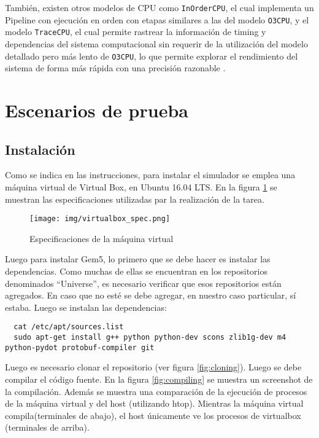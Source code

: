 \documentclass {article}
\begin{document}
También, existen otros modelos de CPU como \texttt{InOrderCPU}, el cual implementa un Pipeline con
ejecución en orden con etapas similares a las del modelo \texttt{O3CPU}, y el modelo
\texttt{TraceCPU}, el cual permite rastrear la información de timing y dependencias del sistema
computacional sin requerir de la utilización del modelo detallado pero más lento de \texttt{O3CPU},
lo que permite explorar el rendimiento del sistema de forma más rápida con una precisión razonable
\cite{binkert2017}.


\section{Escenarios de prueba}

\subsection{Instalación}
Como se indica en las instrucciones, para instalar el simulador se emplea una máquina virtual de
Virtual Box, en Ubuntu 16.04 LTS. En la figura \ref{fig:specs_vbox}
se muestran las especificaciones utilizadas par la realización de la tarea.

\begin{figure}[H]
  \centering
  \texttt{[image: img/virtualbox\_spec.png]}
  \caption{\label{fig:specs_vbox} Especificaciones de la máquina virtual}
\end{figure}
 
Luego para instalar Gem5, lo primero que se debe hacer es instalar las dependencias. Como muchas de
ellas se encuentran en los repositorios denominados “Universe”, es necesario verificar que esos
repositorios están agregados. En caso que no esté se debe agregar, en nuestro caso particular, sí estaba. Luego se instalan las dependencias:

\begin{lstlisting}
  cat /etc/apt/sources.list
  sudo apt-get install g++ python python-dev scons zlib1g-dev m4  python-pydot protobuf-compiler git
\end{lstlisting}
 
Luego es necesario clonar el repositorio (ver figura \ref{fig:cloning}). Luego se debe compilar el
código fuente. En la figura \ref{fig:compiling} se muestra un screenshot de la compilación. Además
se muestra una comparación de la ejecución de procesos de la máquina virtual y del host (utilizando
htop). Mientras la máquina virtual compila(terminales de abajo), el host únicamente ve los procesos
de virtualbox (terminales de arriba). 
\end{document}
